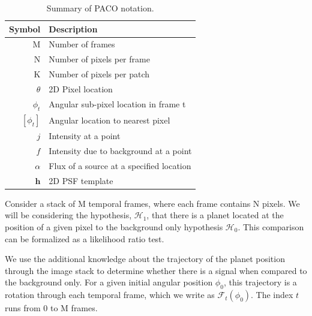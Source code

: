 \documentclass[twocolumn,fleqn]{aastex62}
\begin{document}
\begin{table}
	\centering
	\begin{tabular}{rl}
		\toprule
		Symbol & Description\\
		\midrule
		M & Number of frames\\
		N & Number of pixels per frame\\
		K & Number of pixels per patch\\
		\midrule
		$\theta$ & 2D Pixel location\\
		$\phi_{t}$ & Angular sub-pixel location in frame t\\
		$[\phi_{t}]$ & Angular location to nearest pixel\\
		\midrule
		$j$ & Intensity at a point \\
		$f$ & Intensity due to background at a point\\
		$\alpha$ & Flux of a source at a specified location\\
		$\mathbf{h}$ & 2D PSF template\\
		\bottomrule		
	\end{tabular}
	\caption{\label{tab:notes}Summary of PACO notation.}
\end{table}
Consider a stack of M temporal frames, where each frame contains N pixels. 
We will be considering the hypothesis, $\mathcal{H}_{1}$, that there is a planet located at the position of a given pixel to the background only hypothesis  $\mathcal{H}_{0}$. 
This comparison can be formalized as a likelihood ratio test.

We use the additional knowledge about the trajectory of the planet position through the image stack to determine whether there is a signal when compared to the background only. 
For a given initial angular position $\phi_{0}$, this trajectory is a rotation through each temporal frame, which we write as $\mathcal{F}_{t}(\phi_{0})$. The index $t$ runs from 0 to M frames.
\end{document}
